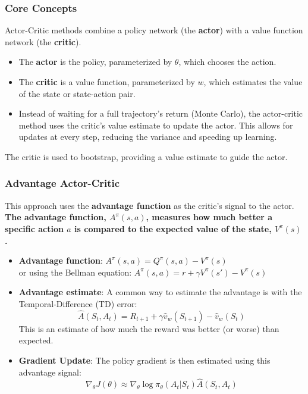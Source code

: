 \documentclass[12pt]{article}
\begin{document}
\subsubsection{Core Concepts}
Actor-Critic methods combine a policy network (the \textbf{actor}) with a value function network (the \textbf{critic}).
\begin{itemize}
    \item The \textbf{actor} is the policy, parameterized by $\theta$, which chooses the action.
    \item The \textbf{critic} is a value function, parameterized by $w$, which estimates the value of the state or state-action pair.
    \item Instead of waiting for a full trajectory's return (Monte Carlo), the actor-critic method uses the critic's value estimate to update the actor. This allows for updates at every step, reducing the variance and speeding up learning.
\end{itemize}
The critic is used to bootstrap, providing a value estimate to guide the actor.

\subsubsection{Advantage Actor-Critic}
This approach uses the \textbf{advantage function} as the critic's signal to the actor. \textbf{The advantage function, $A^{\pi}(s,a)$, measures how much better a specific action $a$ is compared to the expected value of the state, $V^{\pi}(s)$.}
\begin{itemize}
    \item \textbf{Advantage function}:
    $A^\pi(s,a) = Q^\pi(s,a) - V^\pi(s)$ \\
    
     or using the Bellman equation:
    $A^\pi(s,a) = r + \gamma V^\pi(s') - V^\pi(s)$
    \item \textbf{Advantage estimate}: A common way to estimate the advantage is with the Temporal-Difference (TD) error:
    $$ \hat{A}(S_t, A_t) = R_{t+1} + \gamma \hat{v}_w(S_{t+1}) - \hat{v}_w(S_t) $$
    This is an estimate of how much the reward was better (or worse) than expected.
    \item \textbf{Gradient Update}: The policy gradient is then estimated using this advantage signal:
    $$ \nabla_\theta J(\theta) \approx \nabla_\theta \log \pi_\theta(A_t|S_t) \hat{A}(S_t, A_t) $$
\end{itemize}
\end{document}
